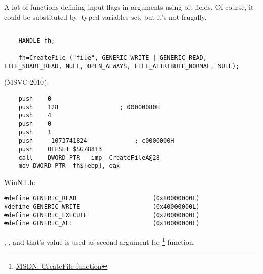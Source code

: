 ﻿%

\section{}
\label{sec:bitfields}

{A lot of functions defining input flags in arguments using bit fields.}
{Of course, it could be substituted by -typed variables set, but it's not frugally.}

\subsection{}


\begin{lstlisting}
	HANDLE fh;

	fh=CreateFile ("file", GENERIC_WRITE | GENERIC_READ, FILE_SHARE_READ, NULL, OPEN_ALWAYS, FILE_ATTRIBUTE_NORMAL, NULL);
\end{lstlisting}

 (MSVC 2010):

\begin{lstlisting}
	push	0
	push	128					; 00000080H
	push	4
	push	0
	push	1
	push	-1073741824				; c0000000H
	push	OFFSET $SG78813
	call	DWORD PTR __imp__CreateFileA@28
	mov	DWORD PTR _fh$[ebp], eax
\end{lstlisting}

 WinNT.h:

\begin{lstlisting}
#define GENERIC_READ                     (0x80000000L)
#define GENERIC_WRITE                    (0x40000000L)
#define GENERIC_EXECUTE                  (0x20000000L)
#define GENERIC_ALL                      (0x10000000L)
\end{lstlisting}

, 
, 
{and that's value is used as second argument for} \footnote{\href{http://msdn.microsoft.com/en-us/library/aa363858(VS.85).aspx}{MSDN: CreateFile function}} function.

